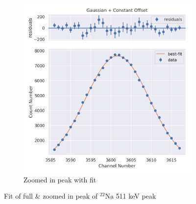 \documentclass[11pt,a4paper]{article}
\newcommand{\element}[2]{$^{#2}\textrm{#1}$}
\begin{document}
\begin{figure}[H]
\begin{subfigure}{.5\linewidth}
    \includegraphics[width=\linewidth]{./Images/Sodium22/Gauss/Gauss_1_Zoom.png}
    \caption{Zoomed in peak with fit}
  \end{subfigure}
  \caption{Fit of full \& zoomed in peak of \element{Na}{22} 511 keV peak}
\end{figure}
\end{document}
